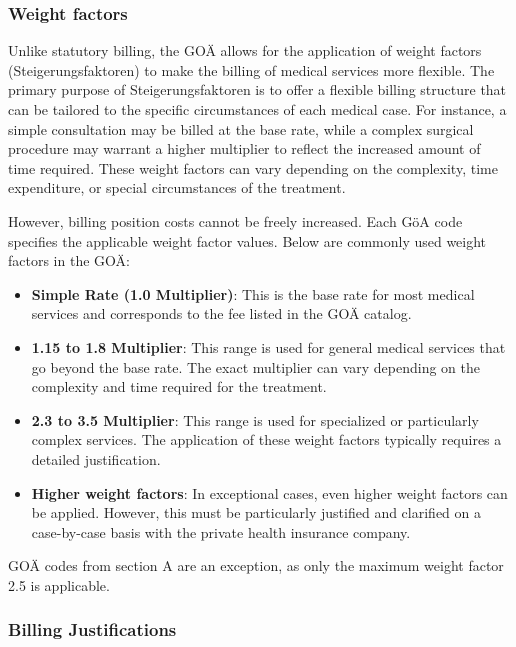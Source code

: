 \subsubsection{Weight factors}
Unlike statutory billing, the GOÄ allows for the application of weight factors (Steigerungsfaktoren) to make the billing of medical services more flexible.
The primary purpose of Steigerungsfaktoren is to offer a flexible billing structure that can be tailored to the specific circumstances of each medical case.
For instance, a simple consultation may be billed at the base rate, while a complex surgical procedure may warrant a higher multiplier to reflect the increased amount of time required.
These weight factors can vary depending on the complexity, time expenditure, or special circumstances of the treatment.

However, billing position costs cannot be freely increased.
Each GöA code specifies the applicable weight factor values.
Below are commonly used weight factors in the GOÄ\cite[]{bruck1998kommentar}:

\begin{itemize}
    \item \textbf{Simple Rate (1.0 Multiplier)}: This is the base rate for most medical services and corresponds to the fee listed in the GOÄ catalog.
    \item \textbf{1.15 to 1.8 Multiplier}: This range is used for general medical services that go beyond the base rate.
    The exact multiplier can vary depending on the complexity and time required for the treatment.
    \item \textbf{2.3 to 3.5 Multiplier}: This range is used for specialized or particularly complex services.
    The application of these weight factors typically requires a detailed justification.
    \item \textbf{Higher weight factors}: In exceptional cases, even higher weight factors can be applied.
    However, this must be particularly justified and clarified on a case-by-case basis with the private health insurance company.
\end{itemize}

GOÄ codes from section A are an exception, as only the maximum weight factor 2.5 is applicable\cite[]{hermanns2011gebuhrenordnung}.

\subsubsection{Billing Justifications}

